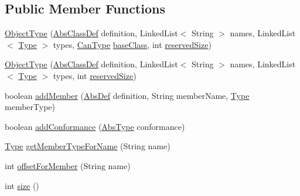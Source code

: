 \subsection*{Public Member Functions}
\begin{DoxyCompactItemize}
\item 
\hyperlink{classcompiler_1_1seman_1_1type_1_1_object_type_abbdf44bd9d18485256d034bd1b54dbfc}{Object\+Type} (\hyperlink{classcompiler_1_1abstr_1_1tree_1_1def_1_1_abs_class_def}{Abs\+Class\+Def} definition, Linked\+List$<$ String $>$ names, Linked\+List$<$ \hyperlink{classcompiler_1_1seman_1_1type_1_1_type}{Type} $>$ types, \hyperlink{classcompiler_1_1seman_1_1type_1_1_can_type}{Can\+Type} \hyperlink{classcompiler_1_1seman_1_1type_1_1_object_type_a776328ea5119061ad683d36d7c8ff1ef}{base\+Class}, int \hyperlink{classcompiler_1_1seman_1_1type_1_1_object_type_a0cb8b416f51705d73146b0b329593d94}{reserved\+Size})
\item 
\hyperlink{classcompiler_1_1seman_1_1type_1_1_object_type_adda7a1c1f33a158d455856f070449bea}{Object\+Type} (\hyperlink{classcompiler_1_1abstr_1_1tree_1_1def_1_1_abs_class_def}{Abs\+Class\+Def} definition, Linked\+List$<$ String $>$ names, Linked\+List$<$ \hyperlink{classcompiler_1_1seman_1_1type_1_1_type}{Type} $>$ types, int \hyperlink{classcompiler_1_1seman_1_1type_1_1_object_type_a0cb8b416f51705d73146b0b329593d94}{reserved\+Size})
\item 
boolean \hyperlink{classcompiler_1_1seman_1_1type_1_1_object_type_a5dfc78e295be7c2357172a04a250e268}{add\+Member} (\hyperlink{classcompiler_1_1abstr_1_1tree_1_1def_1_1_abs_def}{Abs\+Def} definition, String member\+Name, \hyperlink{classcompiler_1_1seman_1_1type_1_1_type}{Type} member\+Type)
\item 
boolean \hyperlink{classcompiler_1_1seman_1_1type_1_1_object_type_a1be124ebec5ad0947421ac67ea064bae}{add\+Conformance} (\hyperlink{classcompiler_1_1abstr_1_1tree_1_1type_1_1_abs_type}{Abs\+Type} conformance)
\item 
\hyperlink{classcompiler_1_1seman_1_1type_1_1_type}{Type} \hyperlink{classcompiler_1_1seman_1_1type_1_1_object_type_acff71113c9cc7c543f8f33a3e46a56c2}{get\+Member\+Type\+For\+Name} (String name)
\item 
int \hyperlink{classcompiler_1_1seman_1_1type_1_1_object_type_a2b0119cb5d5451bbf5cad5e9844c136f}{offset\+For\+Member} (String name)
\item 
int \hyperlink{classcompiler_1_1seman_1_1type_1_1_object_type_a23ca3ee5c26a01e3c4c4fe89fd27082a}{size} ()
\item 

\end{DoxyCompactItemize}
